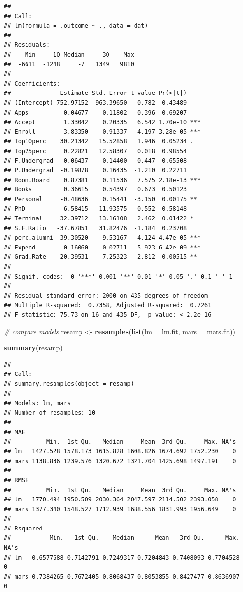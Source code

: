 \documentclass[
]{article}
\newenvironment{Shaded}{\begin{snugshade}}{\end{snugshade}}
\newcommand{\AttributeTok}[1]{\textcolor[rgb]{0.13,0.29,0.53}{#1}}
\newcommand{\CommentTok}[1]{\textcolor[rgb]{0.56,0.35,0.01}{\textit{#1}}}
\newcommand{\FunctionTok}[1]{\textcolor[rgb]{0.13,0.29,0.53}{\textbf{#1}}}
\newcommand{\NormalTok}[1]{#1}
\newcommand{\OtherTok}[1]{\textcolor[rgb]{0.56,0.35,0.01}{#1}}
\begin{document}
\begin{verbatim}
## 
## Call:
## lm(formula = .outcome ~ ., data = dat)
## 
## Residuals:
##    Min     1Q Median     3Q    Max 
##  -6611  -1248     -7   1349   9810 
## 
## Coefficients:
##              Estimate Std. Error t value Pr(>|t|)    
## (Intercept) 752.97152  963.39650   0.782  0.43489    
## Apps         -0.04677    0.11802  -0.396  0.69207    
## Accept        1.33042    0.20335   6.542 1.70e-10 ***
## Enroll       -3.83350    0.91337  -4.197 3.28e-05 ***
## Top10perc    30.21342   15.52858   1.946  0.05234 .  
## Top25perc     0.22821   12.58307   0.018  0.98554    
## F.Undergrad   0.06437    0.14400   0.447  0.65508    
## P.Undergrad  -0.19878    0.16435  -1.210  0.22711    
## Room.Board    0.87381    0.11536   7.575 2.18e-13 ***
## Books         0.36615    0.54397   0.673  0.50123    
## Personal     -0.48636    0.15441  -3.150  0.00175 ** 
## PhD           6.58415   11.93575   0.552  0.58148    
## Terminal     32.39712   13.16108   2.462  0.01422 *  
## S.F.Ratio   -37.67851   31.82476  -1.184  0.23708    
## perc.alumni  39.30520    9.53167   4.124 4.47e-05 ***
## Expend        0.16060    0.02711   5.923 6.42e-09 ***
## Grad.Rate    20.39531    7.25323   2.812  0.00515 ** 
## ---
## Signif. codes:  0 '***' 0.001 '**' 0.01 '*' 0.05 '.' 0.1 ' ' 1
## 
## Residual standard error: 2000 on 435 degrees of freedom
## Multiple R-squared:  0.7358, Adjusted R-squared:  0.7261 
## F-statistic: 75.73 on 16 and 435 DF,  p-value: < 2.2e-16
\end{verbatim}

\begin{Shaded}
\begin{Highlighting}[]
\CommentTok{\# compare models}
\NormalTok{resamp }\OtherTok{\textless{}{-}} \FunctionTok{resamples}\NormalTok{(}\FunctionTok{list}\NormalTok{(}\AttributeTok{lm =}\NormalTok{ lm.fit, }\AttributeTok{mars =}\NormalTok{ mars.fit))}

\FunctionTok{summary}\NormalTok{(resamp)}
\end{Highlighting}
\end{Shaded}

\begin{verbatim}
## 
## Call:
## summary.resamples(object = resamp)
## 
## Models: lm, mars 
## Number of resamples: 10 
## 
## MAE 
##          Min.  1st Qu.   Median     Mean  3rd Qu.     Max. NA's
## lm   1427.528 1578.173 1615.828 1608.826 1674.692 1752.230    0
## mars 1138.836 1239.576 1320.672 1321.704 1425.698 1497.191    0
## 
## RMSE 
##          Min.  1st Qu.   Median     Mean  3rd Qu.     Max. NA's
## lm   1770.494 1950.509 2030.364 2047.597 2114.502 2393.058    0
## mars 1377.340 1548.527 1712.939 1688.556 1831.993 1956.649    0
## 
## Rsquared 
##           Min.   1st Qu.    Median      Mean   3rd Qu.      Max. NA's
## lm   0.6577688 0.7142791 0.7249317 0.7204843 0.7408093 0.7704528    0
## mars 0.7384265 0.7672405 0.8068437 0.8053855 0.8427477 0.8636907    0
\end{verbatim}
\end{document}
